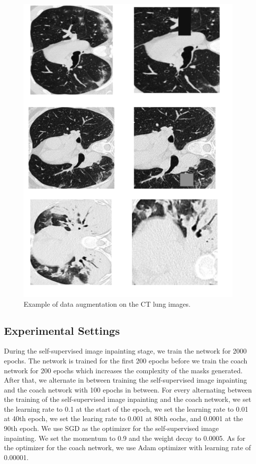 \begin{figure}
	\centering
	\small
	\includegraphics[width=\linewidth]{data_aug.png}
	\caption{Example of data augmentation on the CT lung images.}
	\label{fig:data_aug}
\end{figure}

\subsection{Experimental Settings}
During the self-supervised image inpainting stage, we train the network for 2000 epochs. The network is trained for the first 200 epochs before we train the coach network for 200 epochs which increases the complexity of the masks generated. After that, we alternate in between training the self-supervised image inpainting and the coach network with 100 epochs in between. For every alternating between the training of the self-supervised image inpainting and the coach network, we set the learning rate to 0.1 at the start of the epoch, we set the learning rate to 0.01 at 40th epoch, we set the learing rate to 0.001 at 80th eochs, and 0.0001 at the 90th epoch.  We use SGD as the optimizer for the self-supervised image inpainting.  We set the momentum to 0.9 and the weight decay to 0.0005. As for the optimizer for the coach network, we use Adam optimizer with learning rate of 0.00001.

